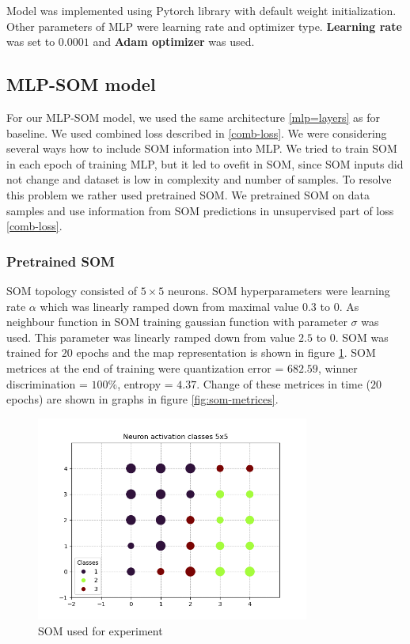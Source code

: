 Model was implemented using Pytorch library \cite{pytorch} with default weight initialization.
Other parameters of MLP were learning rate and optimizer type. \textbf{Learning rate} was set to $0.0001$ and \textbf{Adam optimizer} was used. 




\subsection{MLP-SOM model}
For our MLP-SOM model, we used the same architecture \ref{mlp=layers} as for baseline. We used combined loss described in \ref{comb-loss}. We were considering several ways how to include SOM information into MLP. We tried to train SOM in each epoch of training MLP, but it led to ovefit in SOM, since SOM inputs did not change and dataset is low in complexity and number of samples. To resolve this problem we rather used pretrained SOM. We pretrained SOM on data samples and use information from SOM predictions in unsupervised part of loss \ref{comb-loss}. 


\subsubsection{Pretrained SOM}
\label{pretrained-som}
SOM topology consisted of $5 \times 5$ neurons. SOM hyperparameters were learning rate $\alpha$ which was linearly ramped down from maximal value $0.3$ to $0$. As neighbour function in SOM training gaussian function with parameter $\sigma$ was used. This parameter was linearly ramped down from value $2.5$ to $0$. SOM was trained for $20$ epochs and the map representation is shown in figure \ref{fig:somka}.
SOM metrices at the end of training were quantization error = $682.59$, winner discrimination = $100 \%$, entropy = $4.37$. Change of these metrices in time ($20$ epochs) are shown in graphs in figure \ref{fig:som-metrices}.


\begin{figure}[h!]
    \centering
    \includegraphics[width=0.8\textwidth]{figs/som1710255005.5160155.png}
    \caption{SOM used for experiment}
    \label{fig:somka}
\end{figure}

